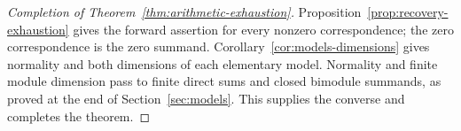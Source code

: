 \begin{proof}[Completion of Theorem~\ref{thm:arithmetic-exhaustion}]
Proposition~\ref{prop:recovery-exhaustion} gives the forward assertion
for every nonzero correspondence; the zero correspondence is the zero
summand.  Corollary~\ref{cor:models-dimensions} gives normality and both
dimensions of each elementary model.  Normality and finite module
dimension pass to finite direct sums and closed bimodule summands, as
proved at the end of Section~\ref{sec:models}.  This supplies the converse
and completes the theorem.
\end{proof}
